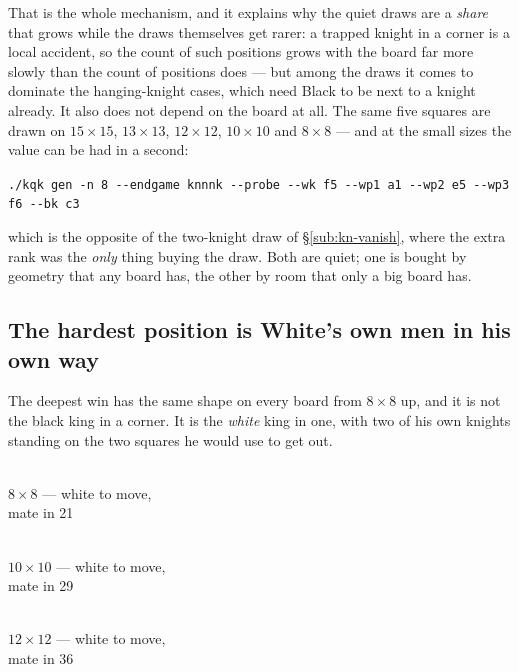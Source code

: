 \documentclass[11pt]{article}
\begin{document}
\noindent
That is the whole mechanism, and it explains why the quiet draws are a
\emph{share} that grows while the draws themselves get rarer: a trapped knight
in a corner is a local accident, so the count of such positions grows with the
board far more slowly than the count of positions does --- but among the draws
it comes to dominate the hanging-knight cases, which need Black to be next to a
knight already. It also does not depend on the board at all. The same five
squares are drawn on $15\times15$, $13\times13$, $12\times12$, $10\times10$ and
$8\times8$ --- and at the small sizes the value can be had in a second:

\begin{center}\small
\texttt{./kqk gen -n 8 -{}-endgame knnnk -{}-probe -{}-wk f5 -{}-wp1 a1 -{}-wp2 e5 -{}-wp3 f6 -{}-bk c3}
\end{center}

\noindent
which is the opposite of the two-knight draw of \S\ref{sub:kn-vanish}, where the extra rank was
the \emph{only} thing buying the draw. Both are quiet; one is bought by
geometry that any board has, the other by room that only a big board has.

\subsection{The hardest position is White's own men in his own way}\label{sub:kn-hardest}

The deepest win has the same shape on every board from $8\times8$ up, and it is
not the black king in a corner. It is the \emph{white} king in one, with two of
his own knights standing on the two squares he would use to get out.

\begin{center}
\begin{minipage}{0.30\textwidth}\centering
{}\\[2mm]
{\small\color{knnnk}\textbf{$8\times8$} --- white to move,\\mate in 21}
\end{minipage}\hfill
\begin{minipage}{0.30\textwidth}\centering
{}\\[2mm]
{\small\color{knnnk}\textbf{$10\times10$} --- white to move,\\mate in 29}
\end{minipage}\hfill
\begin{minipage}{0.30\textwidth}\centering
{}\\[2mm]
{\small\color{knnnk}\textbf{$12\times12$} --- white to move,\\mate in 36}
\end{minipage}
\end{center}
\end{document}
